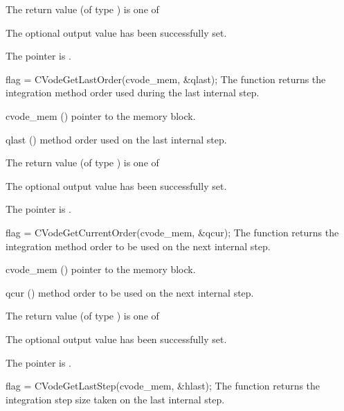 {
  The return value  (of type ) is one of
  \begin{args}
  \item[\Id{CV\_SUCCESS}]
    The optional output value has been successfully set.
  \item[\Id{CV\_MEM\_NULL}]
    The  pointer is .
  \end{args}
}
{}
{
  flag = CVodeGetLastOrder(cvode\_mem, \&qlast);
}
{
  The function  returns the
  integration method order used during the last internal step.
}
{
  \begin{args}
  \item[cvode\_mem] ()
    pointer to the {\cvode} memory block.
  \item[qlast] ()
    method order used on the last internal step.
  \end{args}
}
{
  The return value  (of type ) is one of
  \begin{args}
  \item[\Id{CV\_SUCCESS}]
    The optional output value has been successfully set.
  \item[\Id{CV\_MEM\_NULL}]
    The  pointer is .
  \end{args}
}
{}
{
  flag = CVodeGetCurrentOrder(cvode\_mem, \&qcur);
}
{
  The function  returns the
  integration method order to be used on the next internal step.
}
{
  \begin{args}
  \item[cvode\_mem] ()
    pointer to the {\cvode} memory block.
  \item[qcur] ()
    method order to be used on the next internal step.
  \end{args}
}
{
  The return value  (of type ) is one of
  \begin{args}
  \item[\Id{CV\_SUCCESS}]
    The optional output value has been successfully set.
  \item[\Id{CV\_MEM\_NULL}]
    The  pointer is .
  \end{args}
}
{}
{
  flag = CVodeGetLastStep(cvode\_mem, \&hlast);
}
{
  The function  returns the
  integration step size taken on the last internal step.
}
